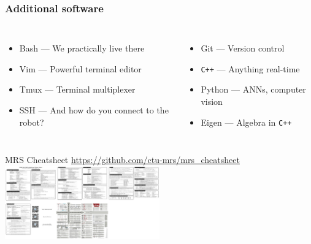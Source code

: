 \documentclass[aspectratio=169]{beamer}
\begin{document}
\begin{frame}
\frametitle{Additional software}

\begin{columns}[c]

\begin{itemize}
  \small \item Bash --- We practically live there
  \small \item Vim --- Powerful terminal editor
  \small \item Tmux --- Terminal multiplexer
  \small \item SSH --- And how do you connect to the robot?
\end{itemize}

\begin{itemize}
  \small \item Git --- Version control
  \small \item \texttt{C++} --- Anything real-time
  \small \item Python --- ANNs, computer vision
  \small \item Eigen --- Algebra in \texttt{C++}
\end{itemize}

\end{columns}

  \begin{block}{MRS Cheatsheet}
    \centering
    \Large\url{https://github.com/ctu-mrs/mrs_cheatsheet}
    \includegraphics[width=0.5\textwidth]{./fig/cheatsheet.jpg}
  \end{block}

\end{frame}


\end{document}
